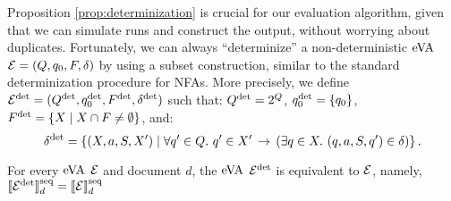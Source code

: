 Proposition \ref*{prop:determinization} is crucial for our evaluation algorithm,
given that we can simulate runs and construct the output, without worrying about
duplicates. Fortunately, we can always ``determinize'' a non-deterministic
$\mathrm{eVA}$ $\mathcal{E} = (Q, q_0, F, \delta)$ by using a subset construction, similar to
the standard determinization procedure for NFAs. More precisely, we define
$\mathcal{E}^{{\operatorname{det}}} = (Q^{{\operatorname{det}}}, q_0^{{\operatorname{det}}}, F^{{\operatorname{det}}}, \delta^{{\operatorname{det}}})$ such that:
$Q^{{\operatorname{det}}} = 2^Q$, $q_0^{{\operatorname{det}}} = \{q_0\}$, $F^{{\operatorname{det}}} = \{X \mid X \cap F \neq
\emptyset\}$, and:
$$
	\delta^{{\operatorname{det}}} = \left\{(X, a, S, X') \mid \forall q' \in Q.\ q' \in X' \, \rightarrow \,  \left(\exists q \in X.\ (q, a, S, q') \in \delta\right)\right\}.
$$

\begin{proposition}\label{prop:eVAdet} For every $\mathrm{eVA}$ $\mathcal{E}$ and document $d$,
	the $\mathrm{eVA}$ $\mathcal{E}^{{\operatorname{det}}}$ is equivalent to $\mathcal{E}$, namely,
	$\llbracket\mathcal{E}^{{\operatorname{det}}}\rrbracket^{\operatorname{seq}}_d = \llbracket\mathcal{E}\rrbracket^{\operatorname{seq}}_d$
\end{proposition}

